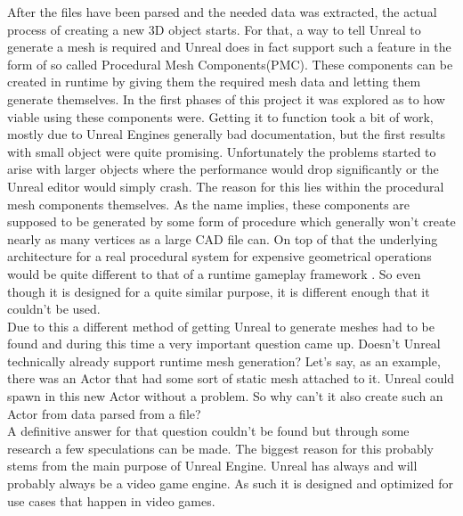 After the files have been parsed and the needed data was extracted, the actual process of creating a new 3D object starts. For that, a way to tell Unreal to generate a mesh is required and Unreal does in fact support such a feature in the form of so called Procedural Mesh Components(PMC). These components can be created in runtime by giving them the required mesh data and letting them generate themselves. In the first phases of this project it was explored as to how viable using these components were. Getting it to function took a bit of work, mostly due to Unreal Engines generally bad documentation, but the first results with small object were quite promising. Unfortunately the problems started to arise with larger objects where the performance would drop significantly or the Unreal editor would simply crash. The reason for this lies within the procedural mesh components themselves. As the name implies, these components are supposed to be generated by some form of procedure which generally won't create nearly as many vertices as a large CAD file can. On top of that the underlying architecture for a real procedural system for expensive geometrical operations would be quite different to that of a runtime gameplay framework \cite{}. So even though it is designed for a quite similar purpose, it is different enough that it couldn't be used.\\
Due to this a different method of getting Unreal to generate meshes had to be found and during this time a very important question came up. Doesn't Unreal technically already support runtime mesh generation? Let's say, as an example, there was an Actor that had some sort of static mesh attached to it. Unreal could spawn in this new Actor without a problem. So why can't it also create such an Actor from data parsed from a file?\\
A definitive answer for that question couldn't be found but through some research a few speculations can be made. The biggest reason for this probably stems from the main purpose of Unreal Engine. Unreal has always and will probably always be a video game engine. As such it is designed and optimized for use cases that happen in video games.


